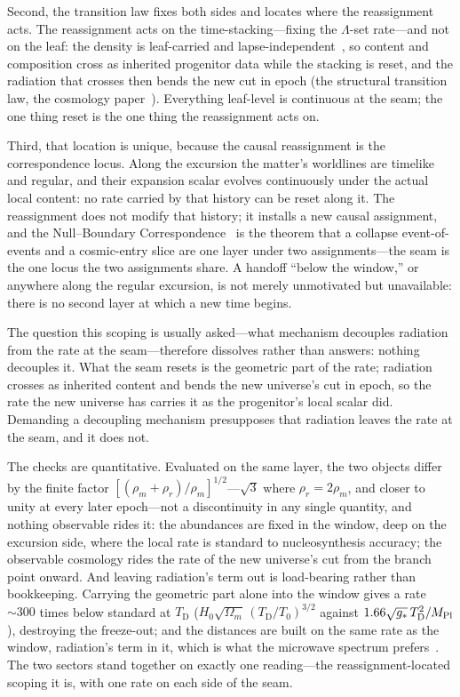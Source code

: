 \documentclass[11pt,a4paper]{article}
\theoremstyle{plain}
\theoremstyle{definition}
\theoremstyle{remark}
\newcommand{\TD}{T_{\mathrm{D}}}
\begin{document}
Second, the transition law fixes both sides and locates where the reassignment acts. The reassignment acts on
the time-stacking---fixing the $\Lambda$-set rate---and not on the leaf: the density is
leaf-carried and lapse-independent~\cite{JanzenOperator}, so content and composition cross as
inherited progenitor data while the stacking is reset, and the radiation that crosses then bends the new cut
in epoch (the structural transition law, the cosmology paper~\cite{JanzenCRcosmology}). Everything leaf-level is continuous at the seam; the
one thing reset is the one thing the reassignment acts on.

Third, that location is unique, because the causal reassignment is the correspondence locus. Along the excursion
the matter's worldlines are timelike and regular, and their expansion scalar evolves continuously
under the actual local content: no rate carried by that history can be reset along it. The
reassignment does not modify that history; it installs a new causal assignment, and the
Null--Boundary Correspondence~\cite{JanzenCRframework} is the theorem that a collapse
event-of-events and a cosmic-entry slice are one layer under two assignments---the seam is the
one locus the two assignments share. A handoff ``below the window,'' or anywhere along the
regular excursion, is not merely unmotivated but unavailable: there is no second layer at which a
new time begins.

The question this scoping is usually asked---what mechanism decouples radiation from the rate at
the seam---therefore dissolves rather than answers: nothing decouples it. What the seam resets is the
geometric part of the rate; radiation crosses as inherited content and bends the new universe's cut in epoch,
so the rate the new universe has carries it as the progenitor's local scalar did. Demanding a decoupling
mechanism presupposes that radiation leaves the rate at the seam, and it does not.

The checks are quantitative. Evaluated on the same layer, the two objects differ by the finite factor
$[(\rho_m+\rho_r)/\rho_m]^{1/2}$---$\sqrt3$ where $\rho_r=2\rho_m$, and closer to unity at every later
epoch---not a discontinuity in any single quantity, and nothing observable
rides it: the abundances are fixed in the window, deep on the excursion side, where the local
rate is standard to nucleosynthesis accuracy; the observable cosmology rides the rate of the new universe's
cut from the branch point onward. And leaving radiation's term out is load-bearing rather than bookkeeping.
Carrying the geometric part alone into
the window gives a rate $\sim\!300$ times below standard at $\TD$
($H_0\sqrt{\Omega_m}\,(\TD/T_0)^{3/2}$ against $1.66\sqrt{g_*}\,\TD^{2}/M_{\rm Pl}$), destroying
the freeze-out; and the distances are built on the same rate as the window, radiation's term in it, which is
what the microwave spectrum prefers~\cite{JanzenCRcosmology}. The two sectors stand together on exactly one reading---the
reassignment-located scoping it is, with one rate on each side of the seam.
\end{document}
